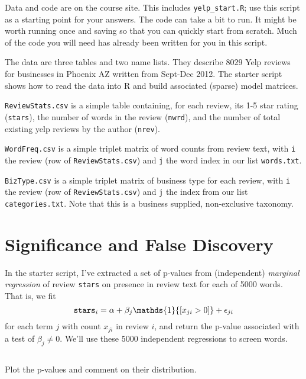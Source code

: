 \documentclass[12pt]{article}
\newcommand{\ds}[1]{\mathds{#1}}
\begin{document}
\pagestyle{empty} 


\bigskip

\noindent
Data and code are on the course site. 
	This includes {\tt yelp\_start.R}; use this script as a starting point for your answers.  The code can take a bit to run.  It might be worth running once and saving so that you can quickly start from scratch.  {\color{Maroon} Much of the code you will need has already been written for you in this script.}


\medskip\noindent
The data are three tables and two name lists.  They describe
8029 Yelp reviews for businesses in Phoenix AZ written from Sept-Dec 2012. The starter script shows how to read the data into R and build associated (sparse) model matrices.

\medskip\noindent
{\tt ReviewStats.csv} is a simple table containing, for each review, its 1-5 star rating ({\tt stars}), the number of words in the review ({\tt nwrd}), and the number of total existing yelp reviews by the author ({\tt nrev}).

\medskip\noindent
{\tt WordFreq.csv} is a simple triplet matrix of word counts from review text, with {\tt i} the review (row of {\tt ReviewStats.csv}) and {\tt j} the word index in our list {\tt words.txt}.  

\medskip\noindent
{\tt BizType.csv} is a simple triplet matrix of business type for each review, with {\tt i} the review (row of {\tt ReviewStats.csv}) and {\tt j} the index from our list {\tt categories.txt}.  Note that this is a business supplied, non-exclusive taxonomy.


\newpage
\section{Significance and False Discovery}

In the starter script, I've extracted a set of p-values
from (independent) {\it marginal regression}  of review {\tt stars} on  presence  in review text for each of  5000 words.  That is, we fit
\[
{\tt stars}_i = \alpha + \beta_j \ds{1}{[x_{ji}>0]} + \epsilon_{ji}
\]
for each term $j$ with count $x_{ji}$ in review $i$, and return the p-value associated with a test of $\beta_{j}\neq0$. We'll use these 5000 independent regressions to screen words.

\subsection{} Plot the p-values and comment on their distribution.
\end{document}
